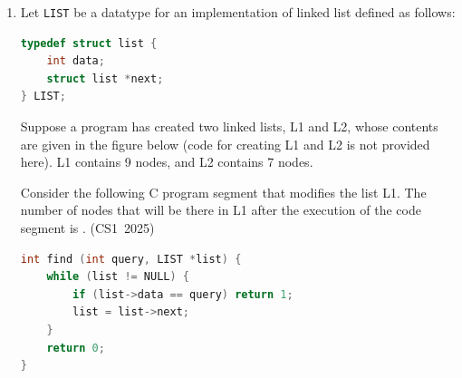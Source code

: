 \begin{enumerate}[label=\thesubsection.\arabic*, ref=\thesubsection.\theenumi]
Tracing the execution step-by-step for $A = \{0, 1, 2, 2, 2, 0, 0, 1, 1\}$ with $\text{size} = 9$:
\begin{align}
\text{foo}(A, 9) &= 1 + \text{foo}(A+1, 8) && (A[0] \neq A[1], \text{ transition } 0 \to 1) \\
&= 1 + 1 + \text{foo}(A+2, 7) && (A[1] \neq A[2], \text{ transition } 1 \to 2) \\
&= 1 + 1 + \text{foo}(A+3, 6) && (A[2] = A[3] = 2) \\
&= 1 + 1 + \text{foo}(A+4, 5) && (A[3] = A[4] = 2) \\
&= 1 + 1 + 1 + \text{foo}(A+5, 4) && (A[4] \neq A[5], \text{ transition } 2 \to 0) \\
&= 1 + 1 + 1 + \text{foo}(A+6, 3) && (A[5] = A[6] = 0) \\
&= 1 + 1 + 1 + 1 + \text{foo}(A+7, 2) && (A[6] \neq A[7], \text{ transition } 0 \to 1) \\
&= 1 + 1 + 1 + 1 + \text{foo}(A+8, 1) && (A[7] = A[8] = 1)
\end{align}

At $\text{size} = 1$, the base case returns $\text{foo}(A+8, 1) = 1$:
\begin{align}
\text{foo}(A, 9) &= 1 + 1 + 1 + 1 + 1 \\
                 &= 5
\end{align}

Therefore, the value printed by the program is $5$.

\vspace{0.5cm}
\item Let \texttt{LIST} be a datatype for an implementation of linked list defined as follows:
\begin{lstlisting}[language=C]
typedef struct list {
    int data;
    struct list *next;
} LIST;
\end{lstlisting}
Suppose a program has created two linked lists, L1 and L2, whose contents are given in the figure below (code for creating L1 and L2 is not provided here). L1 contains 9 nodes, and L2 contains 7 nodes.

\begin{figure}[H]
    \centering
    
\end{figure}

\vspace{0.5cm}
Consider the following C program segment that modifies the list L1. The number of nodes that will be there in L1 after the execution of the code segment is \underline{\hspace{1cm}}.
\hfill (CS1~2025)
\begin{lstlisting}[language=C]
int find (int query, LIST *list) {
    while (list != NULL) {
        if (list->data == query) return 1;
        list = list->next;
    }
    return 0;
}


\end{lstlisting}
\end{enumerate}
